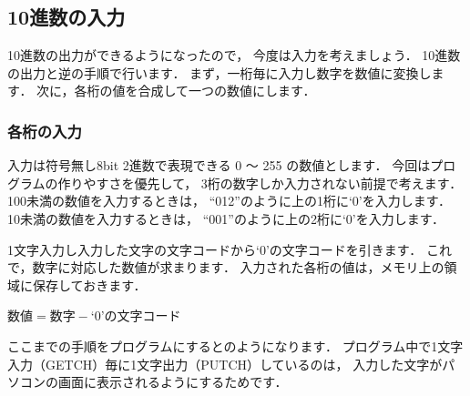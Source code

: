 \subsection{10進数の入力}

10進数の出力ができるようになったので，
今度は入力を考えましょう．
10進数の出力と逆の手順で行います．
まず，一桁毎に入力し数字を数値に変換します．
次に，各桁の値を合成して一つの数値にします．

\subsubsection{各桁の入力}

入力は符号無し8bit 2進数で表現できる 0 〜 255 の数値とします．
今回はプログラムの作りやすさを優先して，
3桁の数字しか入力されない前提で考えます．
100未満の数値を入力するときは，
``012''のように上の1桁に`0'を入力します．
10未満の数値を入力するときは，
``001''のように上の2桁に`0'を入力します．

1文字入力し入力した文字の文字コードから`0'の文字コードを引きます．
これで，数字に対応した数値が求まります．
入力された各桁の値は，メモリ上の領域に保存しておきます．

\begin{center}
$数値 = 数字 - $`0'の文字コード
\end{center}

ここまでの手順をプログラムにするとのようになります．
プログラム中で1文字入力（GETCH）毎に1文字出力（PUTCH）しているのは，
入力した文字がパソコンの画面に表示されるようにするためです．


